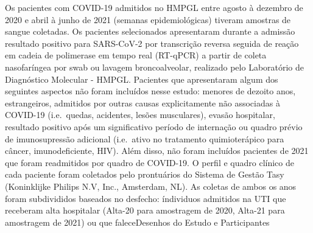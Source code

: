\documentclass[
]{article}
\begin{document}
Os pacientes com COVID-19 admitidos no HMPGL entre agosto à dezembro de 2020 e abril à junho de 2021 (semanas epidemiológicas) tiveram amostras de sangue coletadas. Os pacientes selecionados apresentaram durante a admissão resultado positivo para SARS-CoV-2 por transcrição reversa seguida de reação em cadeia de polimerase em tempo real (RT-qPCR) a partir de coleta nasofaríngea por swab ou lavagem broncoalveolar, realizado pelo Laboratório de Diagnóstico Molecular - HMPGL. Pacientes que apresentaram algum dos seguintes aspectos não foram incluídos nesse estudo: menores de dezoito anos, estrangeiros, admitidos por outras causas explicitamente não associadas à COVID-19 (i.e.~quedas, acidentes, lesões musculares), evasão hospitalar, resultado positivo após um significativo período de internação ou quadro prévio de imunosupressão adicional (i.e.~ativo no tratamento quimioterápico para câncer, imunodeficiente, HIV). Além disso, não foram incluídos pacientes de 2021 que foram readmitidos por quadro de COVID-19.
O perfil e quadro clínico de cada paciente foram coletados pelo prontuários do Sistema de Gestão Tasy (Koninklijke Philips N.V, Inc., Amsterdam, NL). As coletas de ambos os anos foram subdivididos baseados no desfecho: índividuos admitidos na UTI que receberam alta hospitalar (Alta-20 para amostragem de 2020, Alta-21 para amostragem de 2021) ou que faleceDesenhos do Estudo e Participantes
\end{document}
